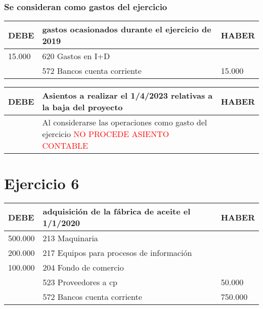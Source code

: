 \documentclass[a4paper,12pt]{article}
\newcommand{\bancos}{572 Bancos cuenta corriente}
\begin{document}
\subsubsection*{Se consideran como gastos del ejercicio}

\begin{table}[H]
    \centering
    \begin{tabular}{|p{3cm}|p{6cm}|p{3cm}|}
    \hline
    \textbf{DEBE} & \textbf{gastos ocasionados durante el ejercicio de 2019} & \textbf{HABER} \\
    \hline
    15.000& 620 Gastos en I+D& \\
    \hline
    & \bancos & 15.000\\
    \hline
    \end{tabular}
\end{table}


\begin{table}[H]
    \centering
    \begin{tabular}{|p{3cm}|p{6cm}|p{3cm}|}
    \hline
    \textbf{DEBE} & \textbf{Asientos a realizar el 1/4/2023 relativas a la baja del proyecto} & \textbf{HABER} \\
    \hline
    & Al considerarse las operaciones como gasto del ejercicio \textcolor{red}{NO PROCEDE ASIENTO CONTABLE}& \\
    \hline
    \end{tabular}
\end{table}

\newpage
\section{Ejercicio 6}


\begin{table}[H]
    \centering
    \begin{tabular}{|p{3cm}|p{6cm}|p{3cm}|}
    \hline
    \textbf{DEBE} & \textbf{adquisición de la fábrica de aceite el 1/1/2020} & \textbf{HABER} \\
    \hline
    500.000& 213 Maquinaria & \\
    \hline
    200.000& 217 Equipos para procesos de información& \\
    \hline
    100.000&204 Fondo de comercio&\\
    \hline
    & 523 Proveedores a cp& 50.000\\
    \hline
    & \bancos& 750.000\\
    \hline
    \end{tabular}
\end{table}
\end{document}
